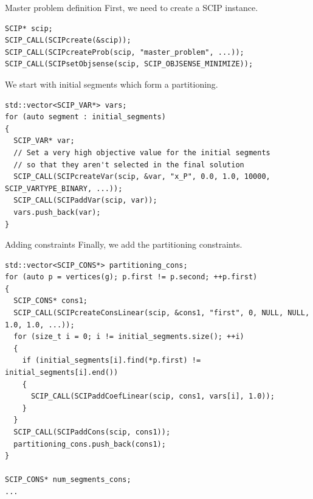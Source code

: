 \documentclass[fleqn]{beamer}
\begin{document}
	\begin{frame}[fragile]{Master problem definition}
        First, we need to create a SCIP instance.
        \begin{verbatim}
SCIP* scip;
SCIP_CALL(SCIPcreate(&scip));
SCIP_CALL(SCIPcreateProb(scip, "master_problem", ...));
SCIP_CALL(SCIPsetObjsense(scip, SCIP_OBJSENSE_MINIMIZE));
        \end{verbatim}
        
        We start with initial segments which form a partitioning.
        \begin{verbatim}
std::vector<SCIP_VAR*> vars;
for (auto segment : initial_segments)
{
  SCIP_VAR* var;
  // Set a very high objective value for the initial segments
  // so that they aren't selected in the final solution
  SCIP_CALL(SCIPcreateVar(scip, &var, "x_P", 0.0, 1.0, 10000, SCIP_VARTYPE_BINARY, ...));
  SCIP_CALL(SCIPaddVar(scip, var));
  vars.push_back(var);
}
        \end{verbatim}
    \end{frame}

    \begin{frame}[fragile]{Adding constraints}
        Finally, we add the partitioning constraints.
        \begin{verbatim}
std::vector<SCIP_CONS*> partitioning_cons;
for (auto p = vertices(g); p.first != p.second; ++p.first)
{
  SCIP_CONS* cons1;
  SCIP_CALL(SCIPcreateConsLinear(scip, &cons1, "first", 0, NULL, NULL, 1.0, 1.0, ...));
  for (size_t i = 0; i != initial_segments.size(); ++i)
  {
    if (initial_segments[i].find(*p.first) != initial_segments[i].end())
    {
      SCIP_CALL(SCIPaddCoefLinear(scip, cons1, vars[i], 1.0));
    }
  }
  SCIP_CALL(SCIPaddCons(scip, cons1));
  partitioning_cons.push_back(cons1);
}

SCIP_CONS* num_segments_cons;
...
        \end{verbatim}
	\end{frame}
\end{document}
